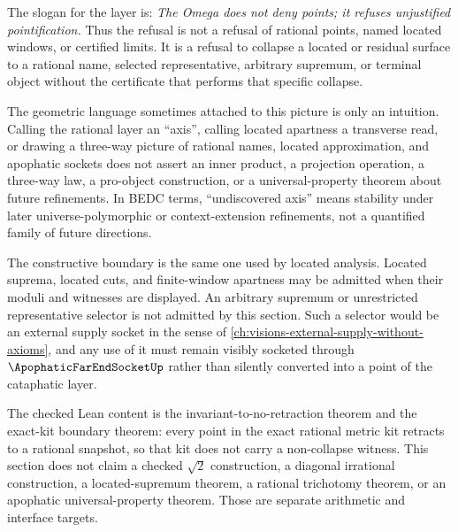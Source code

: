 The slogan for the layer is:
\emph{The Omega does not deny points; it refuses unjustified pointification.}
Thus the refusal is not a refusal of rational points, named located
windows, or certified limits. It is a refusal to collapse a located or
residual surface to a rational name, selected representative, arbitrary
supremum, or terminal object without the certificate that performs that
specific collapse.

The geometric language sometimes attached to this picture is only an
intuition. Calling the rational layer an ``axis'', calling located
apartness a transverse read, or drawing a three-way picture of rational
names, located approximation, and apophatic sockets does not assert an
inner product, a projection operation, a three-way law, a pro-object
construction, or a universal-property theorem about future refinements.
In BEDC terms, ``undiscovered axis'' means stability under later
universe-polymorphic or context-extension refinements, not a quantified
family of future directions.

The constructive boundary is the same one used by located analysis.
Located suprema, located cuts, and finite-window apartness may be
admitted when their moduli and witnesses are displayed. An arbitrary
supremum or unrestricted representative selector is not admitted by this
section. Such a selector would be an external supply socket in the sense
of \autoref{ch:visions-external-supply-without-axioms}, and any use of it
must remain visibly socketed through $\ApophaticFarEndSocketUp$ rather
than silently converted into a point of the cataphatic layer.

\begin{remark}
\label{rem:cataphatic-apophatic-formal-scope}
The checked Lean content is the invariant-to-no-retraction theorem and
the exact-kit boundary theorem: every point in the exact rational metric
kit retracts to a rational snapshot, so that kit does not carry a
non-collapse witness. This section does not claim a checked $\sqrt2$
construction, a diagonal irrational construction, a located-supremum
theorem, a rational trichotomy theorem, or an apophatic
universal-property theorem. Those are separate arithmetic and interface
targets.
\end{remark}

